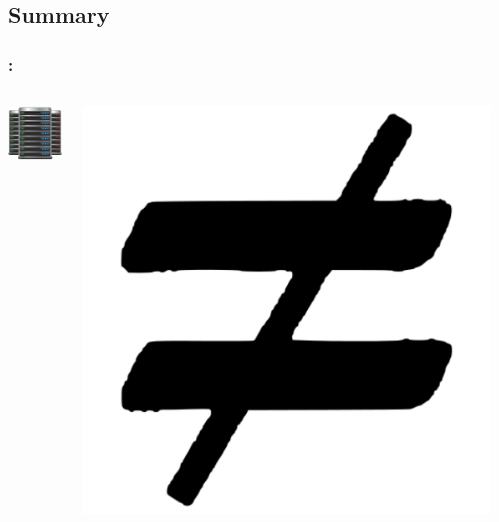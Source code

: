 \documentclass[9pt,xcolor=table]{beamer}
\begin{document}
\subsection{Summary}
\begin{frame}
\frametitle{\insertsectionhead{}: \insertsubsection{}}
\begin{columns}[c]
  \begin{column}{.35\textwidth}
    \begin{center}
      \includegraphics[height=0.3\textheight]{img/iconfinder_data-center}
    \end{center}
  \end{column}
  \begin{column}{.2\textwidth}
    \begin{center}
      \includegraphics[height=0.2\textheight]{img/openclipart_not_equal} 
    \end{center}
  \end{column}
  \begin{column}{.35\textwidth}

\end{column}
\end{columns}
\end{frame}
\end{document}
